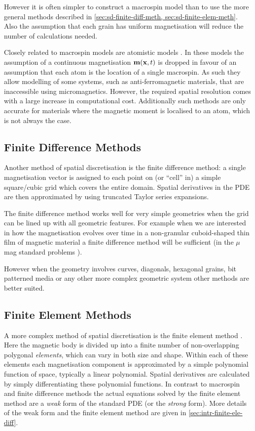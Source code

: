 However it is often simpler to construct a macrospin model than to use the more general methods described in \cref{sec:sd-finite-diff-meth, sec:sd-finite-elem-meth}.
Also the assumption that each grain has uniform magnetisation will reduce the number of calculations needed.

Closely related to macrospin models are atomistic models \cite{Evans2014}.
In these models the assumption of a continuous magnetisation $\mathbf{m}(\mathbf{x}, t)$ is dropped in favour of an assumption that each atom is the location of a single macrospin.
As such they allow modelling of some systems, such as anti-ferromagnetic materials, that are inaccessible using micromagnetics.
However, the required spatial resolution comes with a large increase in computational cost.
Additionally  such methods are only accurate for materials where the magnetic moment is localised to an atom, which is not always the case.


\subsection{Finite Difference Methods}
\label{sec:sd-finite-diff-meth}

Another method of spatial discretisation is the finite difference method: a single magnetisation vector is assigned to each point on (or ``cell'' in) a simple square/cubic grid which covers the entire domain.
Spatial derivatives in the PDE are then approximated by using truncated Taylor series expansions.

The finite difference method works well for very simple geometries when the grid can be lined up with all geometric features.
For example when we are interested in how the magnetisation evolves over time in a non-granular cuboid-shaped thin film of magnetic material a finite difference method will be sufficient (\eg in the $\mu$mag standard problems \cite{mumag-website}).

However when the geometry involves curves, diagonals, hexagonal grains, bit patterned media or any other more complex geometric system other methods are better suited.


\subsection{Finite Element Methods}
\label{sec:sd-finite-elem-meth}

A more complex method of spatial discretisation is the finite element method \cite{HowardElmanDavidSilvester2006}.
Here the magnetic body is divided up into a finite number of non-overlapping polygonal \emph{elements}, which can vary in both size and shape.
Within each of these elements each magnetisation component is approximated by a simple polynomial function of space, typically a linear polynomial.
Spatial derivatives are calculated by simply differentiating these polynomial functions.
In contrast to macrospin and finite difference methods the actual equations solved by the finite element method are a \emph{weak} form of the standard PDE (or the \emph{strong} form).
More details of the weak form and the finite element method are given in \cref{sec:intr-finite-ele-diff}.


